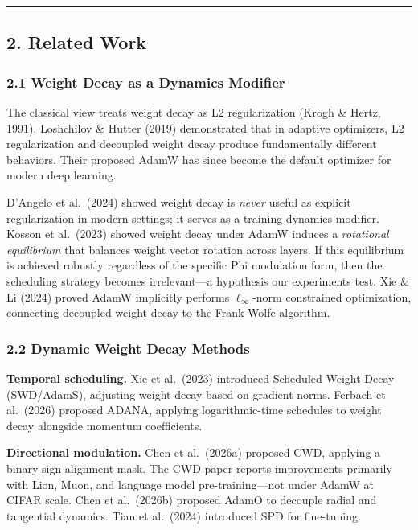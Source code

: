 \documentclass[
]{article}
\begin{document}
\begin{center}\rule{0.5\linewidth}{0.5pt}\end{center}

\hypertarget{related-work}{%
\subsection{2. Related Work}\label{related-work}}

\hypertarget{weight-decay-as-a-dynamics-modifier}{%
\subsubsection{2.1 Weight Decay as a Dynamics
Modifier}\label{weight-decay-as-a-dynamics-modifier}}

The classical view treats weight decay as L2 regularization (Krogh \&
Hertz, 1991). Loshchilov \& Hutter (2019) demonstrated that in adaptive
optimizers, L2 regularization and decoupled weight decay produce
fundamentally different behaviors. Their proposed AdamW has since become
the default optimizer for modern deep learning.

D'Angelo et al.~(2024) showed weight decay is \emph{never} useful as
explicit regularization in modern settings; it serves as a training
dynamics modifier. Kosson et al.~(2023) showed weight decay under AdamW
induces a \emph{rotational equilibrium} that balances weight vector
rotation across layers. If this equilibrium is achieved robustly
regardless of the specific Phi modulation form, then the scheduling
strategy becomes irrelevant---a hypothesis our experiments test. Xie \&
Li (2024) proved AdamW implicitly performs \(\ell_\infty\)-norm
constrained optimization, connecting decoupled weight decay to the
Frank-Wolfe algorithm.

\hypertarget{dynamic-weight-decay-methods}{%
\subsubsection{2.2 Dynamic Weight Decay
Methods}\label{dynamic-weight-decay-methods}}

\textbf{Temporal scheduling.} Xie et al.~(2023) introduced Scheduled
Weight Decay (SWD/AdamS), adjusting weight decay based on gradient
norms. Ferbach et al.~(2026) proposed ADANA, applying logarithmic-time
schedules to weight decay alongside momentum coefficients.

\textbf{Directional modulation.} Chen et al.~(2026a) proposed CWD,
applying a binary sign-alignment mask. The CWD paper reports
improvements primarily with Lion, Muon, and language model
pre-training---not under AdamW at CIFAR scale. Chen et al.~(2026b)
proposed AdamO to decouple radial and tangential dynamics. Tian et
al.~(2024) introduced SPD for fine-tuning.
\end{document}
